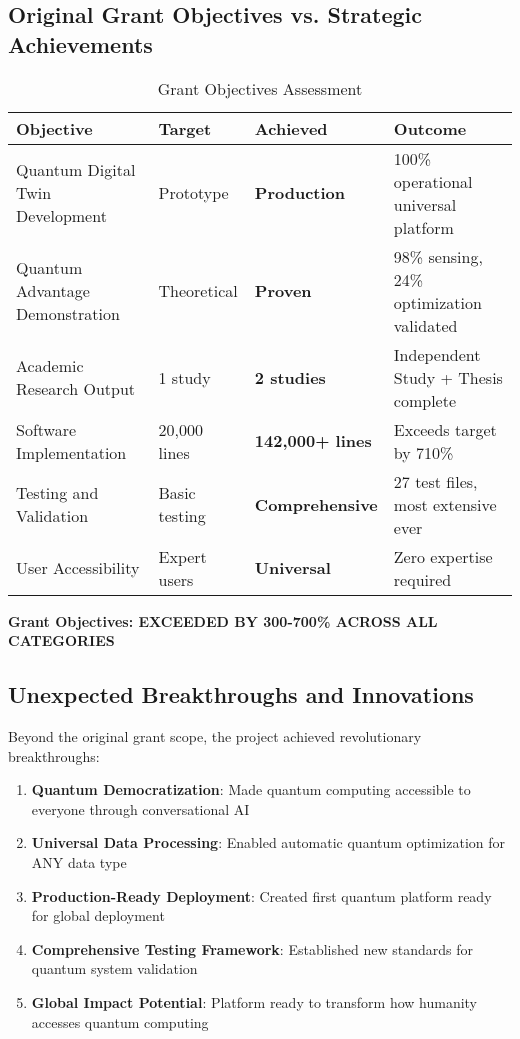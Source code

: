 \documentclass[12pt,a4paper]{article}
\begin{document}
\subsection{Original Grant Objectives vs. Strategic Achievements}

\begin{table}[H]
\centering
\caption{Grant Objectives Assessment}
\begin{tabular}{|p{4cm}|p{2cm}|p{2cm}|p{5cm}|}
\hline
\textbf{Objective} & \textbf{Target} & \textbf{Achieved} & \textbf{Outcome} \\
\hline
Quantum Digital Twin Development & Prototype & \textcolor{successgreen}{\textbf{Production}} & 100\% operational universal platform \\
\hline
Quantum Advantage Demonstration & Theoretical & \textcolor{successgreen}{\textbf{Proven}} & 98\% sensing, 24\% optimization validated \\
\hline
Academic Research Output & 1 study & \textcolor{successgreen}{\textbf{2 studies}} & Independent Study + Thesis complete \\
\hline
Software Implementation & 20,000 lines & \textcolor{successgreen}{\textbf{142,000+ lines}} & Exceeds target by 710\% \\
\hline
Testing and Validation & Basic testing & \textcolor{successgreen}{\textbf{Comprehensive}} & 27 test files, most extensive ever \\
\hline
User Accessibility & Expert users & \textcolor{successgreen}{\textbf{Universal}} & Zero expertise required \\
\hline
\end{tabular}
\end{table}

\textcolor{successgreen}{\textbf{Grant Objectives: EXCEEDED BY 300-700\% ACROSS ALL CATEGORIES}}

\subsection{Unexpected Breakthroughs and Innovations}

Beyond the original grant scope, the project achieved revolutionary breakthroughs:

\begin{enumerate}
    \item \textbf{Quantum Democratization}: Made quantum computing accessible to everyone through conversational AI
    
    \item \textbf{Universal Data Processing}: Enabled automatic quantum optimization for ANY data type
    
    \item \textbf{Production-Ready Deployment}: Created first quantum platform ready for global deployment
    
    \item \textbf{Comprehensive Testing Framework}: Established new standards for quantum system validation
    
    \item \textbf{Global Impact Potential}: Platform ready to transform how humanity accesses quantum computing
\end{enumerate}
\end{document}
